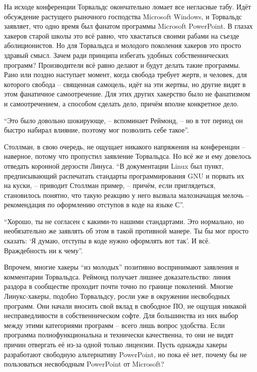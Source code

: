 На исходе конференции Торвальдс окончательно ломает все негласные табу. Идёт обсуждение растущего рыночного господства Microsoft Windows, и Торвальдс заявляет, что одно время был фанатом программы Microsoft PowerPoint. В глазах хакеров старой школы это всё равно, что хвастаться своими рабами на съезде аболиционистов. Но для Торвальдса и молодого поколения хакеров это просто здравый смысл. Зачем ради принципа избегать удобных собственнических программ? Производители всё равно делают и будут делать такие программы. Рано или поздно наступает момент, когда свобода требует жертв, и человек, для которого свобода -- священная самоцель, идёт на эти жертвы, но другие видят в этом фанатичное самоотречение. Для этих других хакерство было не фанатизмом и самоотречением, а способом сделать дело, причём вполне конкретное дело.

``Это было довольно шокирующе, -- вспоминает Реймонд, -- но в тот период он быстро набирал влияние, поэтому мог позволить себе такое''.

Столлман, в свою очередь, не ощущает никакого напряжения на конференции -- наверное, потому что пропустил заявление Торвальдса. Но всё же и ему довелось отведать коронной дерзости Линуса. ``В документации Linux был пункт, предписывающий распечатать стандарты программирования GNU и порвать их на куски, -- приводит Столлман пример, -- причём, если приглядеться, становилось понятно, что такую реакцию у него вызвала малозначащая мелочь -- рекомендация по оформлению отступов в коде на языке С''.

``Хорошо, ты не согласен с какими-то нашими стандартами. Это нормально, но необязательно же заявлять об этом в такой противной манере. Ты бы мог просто сказать: `Я думаю, отступы в коде нужно оформлять вот так'. И всё. Враждебность ни к чему''.

Впрочем, многие хакеры ``из молодых'' позитивно воспринимают заявления и комментарии Торвальдса. Реймонд получает лишнее доказательство: линия раздора в сообществе проходит почти точно по границе поколений. Многие Линукс-хакеры, подобно Торвальдсу, росли уже в окружении несвободных программ. Они начали вносить свой вклад в свободное ПО, не ощущая никакой несправедливости в собственническом софте. Для большинства из них выбор между этими категориями программ -- всего лишь вопрос удобства. Если программа полнофункциональна и технически качественна, то они не видят причин отвергать её из-за одной только лицензии. Пусть однажды хакеры разработают свободную альтернативу PowerPoint, но пока её нет, почему бы не пользоваться несвободным PowerPoint от Microsoft?

